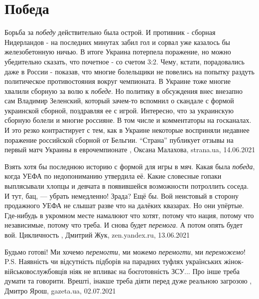  
 
 
 
 
\chapter{Победа}
\label{sec:slova.pobeda}

Борьба за \emph{победу} действительно была острой. И противник - сборная Нидерландов -
на последних минутах забил гол и сорвал уже казалось бы железобетонную ничью.
В итоге Украина потерпела поражение, но можно убедительно сказать, что почетное
- со счетом 3:2. Чему, кстати, порадовались даже в России - показав, что многие
болельщики не повелись на попытку раздуть политическое противостояния вокруг
чемпионата. В Украине тоже многие хвалили сборную за волю к \emph{победе}. Но
политику в обсуждения внес внезапно сам Владимир Зеленский, который зачем-то
вспомнил о скандале с формой украинской сборной, поздравляя ее с игрой.
Интересно, что за украинскую сборную болели и многие россияне. В том числе и
комментаторы на госканалах. И это резко контрастирует с тем, как в Украине
некоторые восприняли недавнее поражение российской сборной от Бельгии.
\enquote{Страна} публикует отзывы на первый матч Украины в еврочемпионате
, 
Оксана Малахова, strana.ua, 14.06.2021

Взять хотя бы последнюю историю с формой для игры в мяч. Какая была \emph{победа},
когда УЕФА по недопониманию утвердила её. Какие словесные гопаки выплясывали
хлопцы и девчата в появившейся возможности потроллить соседа. И тут, бац, —
убрать немедленно! Зрада? Ещё бы. Вой неистовый в сторону продажного УЕФА не
слышат разве что на далёких квазарах. Но они упёртые. Где-нибудь в укромном
месте намалюют что хотят, потому что нация, потому что независимые, потому что
треба. И снова будет \emph{перемога}. А потом опять будет вой. Цикличность
, 
Дмитрий Жук, zen.yandex.ru, 13.06.2021 

Будьмо готові!  Ми хочемо \emph{перемогти}, ми можемо \emph{перемогти}, ми
\emph{переможемо}!  P.S. Наявність чи відсутність підборів на парадних туфлях
українських жінок-військовослужбовців ніяк не впливає на боєготовність ЗСУ... Про
інше треба думати та говорити.  Врешті, інакше треба діяти перед дуже реальною
загрозою
, 
Дмитро Ярош, gazeta.ua, 02.07.2021

